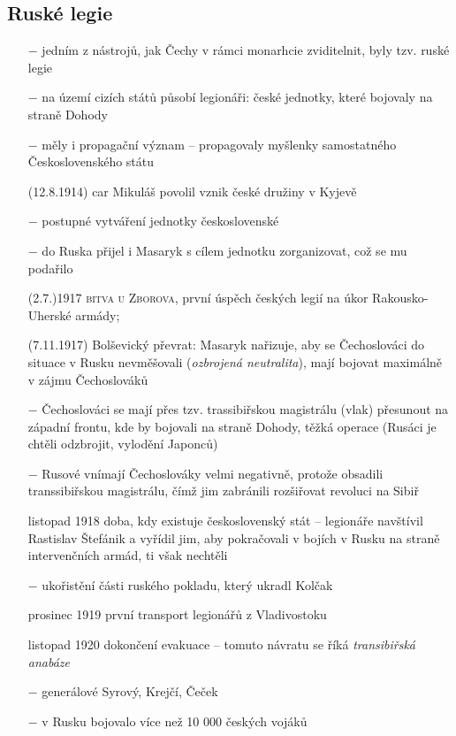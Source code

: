 \documentclass{article}
\begin{document}
\subsection*{Ruské legie}
\begin{itemize}
    \vspace{-0.5em}
    \setlength\itemsep{0.15em}
    \item[$-$] jedním z nástrojů, jak Čechy v rámci monarhcie zviditelnit, byly tzv. ruské legie
    \item[$-$] na území cizích států působí legionáři: české jednotky, které bojovaly na straně Dohody
    \item[$-$] měly i propagační význam -- propagovaly myšlenky samostatného Československého státu
    \item[(12.8.1914)] car Mikuláš povolil vznik české družiny v Kyjevě
    \item[$-$] postupné vytváření jednotky československé
    \item[$-$] do Ruska přijel i Masaryk s cílem jednotku zorganizovat, což se mu podařilo
    \item[(2.7.)1917] \textsc{bitva u Zborova}, první úspěch českých legií na úkor Rakousko-Uherské armády;
    \item[(7.11.1917)] Bolševický převrat: Masaryk nařizuje, aby se Čechoslováci do situace v Rusku nevměšovali (\textit{ozbrojená neutralita}), mají bojovat maximálně v zájmu Čechoslováků
    \item[$-$] Čechoslováci se mají přes tzv. trassibiřskou magistrálu (vlak) přesunout na západní frontu, kde by bojovali na straně Dohody, těžká operace (Rusáci je chtěli odzbrojit, vylodění Japonců)
    \item[$-$] Rusové vnímají Čechoslováky velmi negativně, protože obsadili transsibiřskou magistrálu, čímž jim zabránili rozšiřovat revoluci na Sibiř
    \item[listopad 1918] doba, kdy existuje československý stát -- legionáře navštívil Rastislav Štefánik a vyřídil jim, aby pokračovali v bojích v Rusku na straně intervenčních armád, ti však nechtěli
    \item[$-$] ukořistění části ruského pokladu, který ukradl Kolčak
    \item[prosinec 1919] první transport legionářů z Vladivostoku
    \item[listopad 1920] dokončení evakuace -- tomuto návratu se říká \textit{transibiřská anabáze}
    \item[$-$] generálové Syrový, Krejčí, Čeček
    \item[$-$] v Rusku bojovalo více než 10 000 českých vojáků
\end{itemize}
\end{document}
